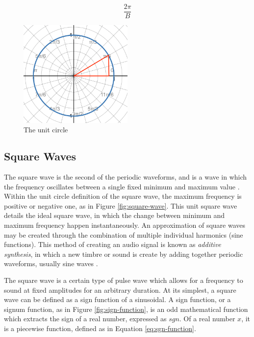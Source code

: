 \begin{equation}
	\frac{2\pi}{B}
	\label{eq:sine-wave-period}
\end{equation}

\begin{figure}
	\centering
	\includegraphics[width=0.5\textwidth]{figures/unit-circle.png}
	\caption{The unit circle}
	\label{fig:unit-circle}
\end{figure}

\subsection{Square Waves}
The square wave is the second of the periodic waveforms, and is a wave in which the frequency oscillates between a single fixed minimum and maximum value \cite{Tarr_2019}. Within the unit circle definition of the square wave, the maximum frequency is positive or negative one, as in Figure \ref{fig:square-wave}. This unit square wave details the ideal square wave, in which the change between minimum and maximum frequency happen instantaneously. An approximation of square waves may be created through the combination of multiple individual harmonics (sine functions). This method of creating an audio signal is known as \textit{additive synthesis}, in which a new timbre or sound is create by adding together periodic waveforms, usually sine waves \cite{Tarr_2019}. 

The square wave is a certain type of pulse wave which allows for a frequency to sound at fixed amplitudes for an arbitrary duration. At its simplest, a square wave can be defined as a sign function of a sinusoidal. A sign function, or a signum function, as in Figure \ref{fig:sign-function}, is an odd mathematical function which extracts the sign of a real number, expressed as $sgn$. Of a real number $x$, it is a piecewise function, defined as in Equation \ref{eq:sgn-function}.

